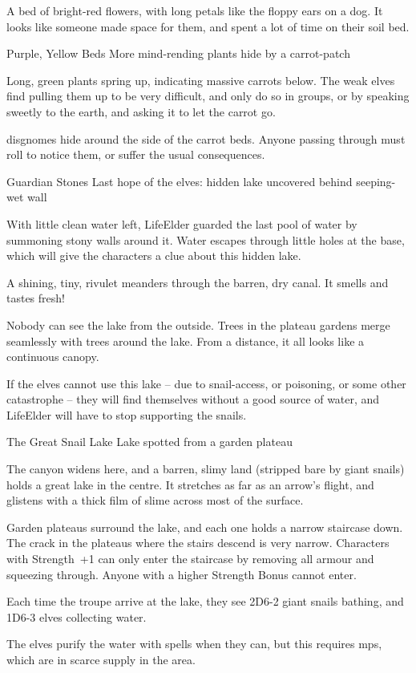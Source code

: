 \begin{boxtext}
  A bed of bright-red flowers, with long petals like the floppy ears on a dog.
  It looks like someone made space for them, and spent a lot of time on their soil bed.
\end{boxtext}

{Purple, Yellow Beds}%
{More mind-rending plants hide by a carrot-patch}%

Long, green plants spring up, indicating massive carrots below.
The weak elves find pulling them up to be very difficult, and only do so in groups, or by speaking sweetly to the earth, and asking it to let the carrot go.

\Glspl{disgnome} hide around the side of the carrot beds.
Anyone passing through must roll to notice them, or suffer the usual consequences.

{Guardian Stones}%
{Last hope of the elves: hidden lake uncovered behind seeping-wet wall}%

With little clean water left, \gls{LifeElder} guarded the last pool of water by summoning stony walls around it.
Water escapes through little holes at the base, which will give the characters a clue about this hidden lake.

\begin{boxtext}
  A shining, tiny, rivulet meanders through the barren, dry canal.
  It smells and tastes fresh!
\end{boxtext}

Nobody can see the lake from the outside.
Trees in the plateau gardens merge seamlessly with trees around the lake.
From a distance, it all looks like a continuous canopy.

If the elves cannot use this lake -- due to snail-access, or poisoning, or some other catastrophe -- they will find themselves without a good source of water, and \gls{LifeElder} will have to stop supporting the snails.

{The Great Snail Lake}%
{Lake spotted from a garden plateau}%

The canyon widens here, and a barren, slimy land (stripped bare by giant snails) holds a great lake in the centre.
It stretches as far as an arrow's flight, and glistens with a thick film of slime across most of the surface.

Garden plateaus surround the lake, and each one holds a narrow staircase down.
The crack in the plateaus where the stairs descend is very narrow.
Characters with Strength~+1 can only enter the staircase by removing all armour and squeezing through.
Anyone with a higher Strength Bonus cannot enter.

Each time the troupe arrive at the lake,
they see 2D6-2 giant snails bathing, and 1D6-3 elves collecting water.

The elves purify the water with spells when they can, but this requires \glspl{mp}, which are in scarce supply in the area.

